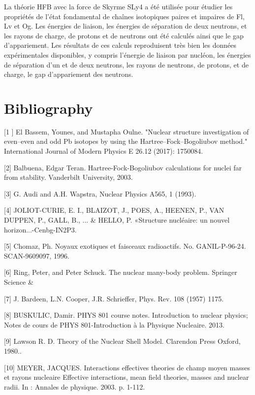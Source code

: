 La théorie HFB avec la force de Skyrme SLy4 a été utilisée pour étudier les propriétés de l’état fondamental de chaînes isotopiques paires et impaires de Fl, Lv et Og. Les énergies de liaison, les énergies de séparation de deux neutrons, et les rayons de charge, de protons et de neutrons ont été calculés ainsi que le gap d’appariement. Les résultats de ces calculs reproduisent très bien les données expérimentales disponibles, y compris l’énergie de liaison par nucléon, les énergies de séparation d’un et de deux neutrons, les rayons de neutrons, de protons, et de charge, le gap d’appariement des neutrons. 



\section[Bibliography]{\textenglish{Bibliography}}
\textenglish{[1 ] El Bassem, Younes, and Mustapha Oulne. "Nuclear structure investigation of even–even and odd Pb isotopes by using the Hartree–Fock–Bogoliubov method." International Journal of Modern Physics E 26.12 (2017): 1750084.}

\textenglish{[2] Balbuena, Edgar Teran. Hartree-Fock-Bogoliubov calculations for nuclei far from stability. Vanderbilt University, 2003.}

\textenglish{[3] G. Audi and A.H. Wapstra, Nuclear Physics A565, 1 (1993).}

\textenglish{[4] JOLIOT-CURIE, E. I., BLAIZOT, J., POES, A., HEENEN, P., VAN DUPPEN, P., GALL, B., ... }\& HELLO, P. «Structure nucléaire: un nouvel horizon...-Cenbg-IN2P3.

[5] Chomaz, Ph. Noyaux exotiques et faisceaux radioactifs. \textenglish{No. GANIL-P-96-24. SCAN-9609097, 1996.}

\textenglish{[6] Ring, Peter, and Peter Schuck. The nuclear many-body problem. Springer Science \&  }

\textenglish{[7] J. Bardeen, L.N. Cooper, J.R. Schrieffer, Phys. }Rev. 108 (1957) 1175.

[8] BUSKULIC, Damir. PHYS 801 course notes. Introduction to nuclear physics; Notes de cours de PHYS 801-Introduction à la Physique Nucleaire. \textenglish{2013.}

\textenglish{[9] Lawson R. D. Theory of the Nuclear Shell Model. Clarendon Press Oxford, 1980..}

\textenglish{[10] MEYER, JACQUES. Interactions effectives theories de champ moyen masses et rayons nucleaire Effective interactions, mean field theories, masses and nuclear radii. In : } \textenglish{Annales de physique. 2003. p. 1-112.}

